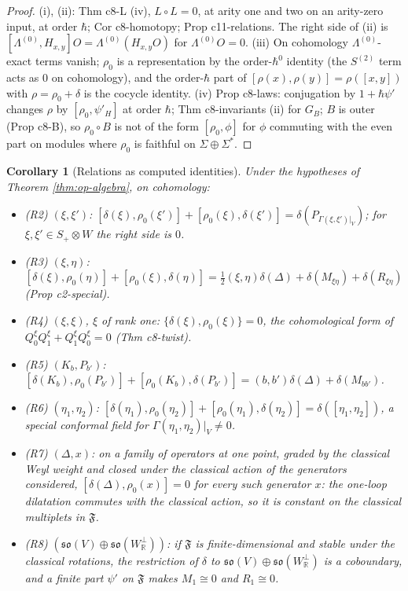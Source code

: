 \documentclass[11pt]{article}
\numberwithin{equation}{section}
\theoremstyle{plain}
\newtheorem{corollary}[theorem]{Corollary}
\theoremstyle{definition}
\begin{document}
\begin{proof}
(i), (ii): Thm c8-L (iv), $L\circ L=0$, at arity one and two on an arity-zero input, at order $\hbar$; Cor c8-homotopy; Prop c11-relations. The right side of (ii) is $[\Lambda^{(0)},H_{x,y}]O=\Lambda^{(0)}(H_{x,y}O)$ for $\Lambda^{(0)}O=0$. (iii) On cohomology $\Lambda^{(0)}$-exact terms vanish; $\rho_0$ is a representation by the order-$\hbar^0$ identity (the $S^{(2)}$ term acts as $0$ on cohomology), and the order-$\hbar$ part of $[\rho(x),\rho(y)]=\rho([x,y])$ with $\rho=\rho_0+\delta$ is the cocycle identity. (iv) Prop c8-laws: conjugation by $1+\hbar\psi'$ changes $\rho$ by $[\rho_0,\psi'_H]$ at order $\hbar$; Thm c8-invariants (ii) for $G_B$; $B$ is outer (Prop c8-B), so $\rho_0\circ B$ is not of the form $[\rho_0,\phi]$ for $\phi$ commuting with the even part on modules where $\rho_0$ is faithful on $\Sigma\oplus\Sigma^*$.
\end{proof}

\begin{corollary}[Relations as computed identities]
\label{cor:op-relations}
Under the hypotheses of Theorem \ref{thm:op-algebra}, on cohomology:
\begin{itemize}
\item (R2) $(\xi,\xi')$: $[\delta(\xi),\rho_0(\xi')]+[\rho_0(\xi),\delta(\xi')]=\delta(P_{\Gamma(\xi,\xi')|_V})$; for $\xi,\xi'\in S_+\otimes W$ the right side is $0$.
\item (R3) $(\xi,\eta)$: $[\delta(\xi),\rho_0(\eta)]+[\rho_0(\xi),\delta(\eta)]=\tfrac12(\xi,\eta)\delta(\Delta)+\delta(M_{\xi\eta})+\delta(R_{\xi\eta})$ (Prop c2-special).
\item (R4) $(\xi,\xi)$, $\xi$ of rank one: $\{\delta(\xi),\rho_0(\xi)\}=0$, the cohomological form of $Q^\xi_0Q^\xi_1+Q^\xi_1Q^\xi_0=0$ (Thm c8-twist).
\item (R5) $(K_b,P_{b'})$: $[\delta(K_b),\rho_0(P_{b'})]+[\rho_0(K_b),\delta(P_{b'})]=(b,b')\delta(\Delta)+\delta(M_{bb'})$.
\item (R6) $(\eta_1,\eta_2)$: $[\delta(\eta_1),\rho_0(\eta_2)]+[\rho_0(\eta_1),\delta(\eta_2)]=\delta([\eta_1,\eta_2])$, a special conformal field for $\Gamma(\eta_1,\eta_2)|_V\ne0$.
\item (R7) $(\Delta,x)$: on a family of operators at one point, graded by the classical Weyl weight and closed under the classical action of the generators considered, $[\delta(\Delta),\rho_0(x)]=0$ for every such generator $x$: the one-loop dilatation commutes with the classical action, so it is constant on the classical multiplets in $\mathfrak F$.
\item (R8) $(\mathfrak{so}(V)\oplus\mathfrak{so}(W_{\mathbb R}^\perp))$: if $\mathfrak F$ is finite-dimensional and stable under the classical rotations, the restriction of $\delta$ to $\mathfrak{so}(V)\oplus\mathfrak{so}(W_{\mathbb R}^\perp)$ is a coboundary, and a finite part $\psi'$ on $\mathfrak F$ makes $M_1\cong0$ and $R_1\cong0$.
\end{itemize}
\end{corollary}
\end{document}
